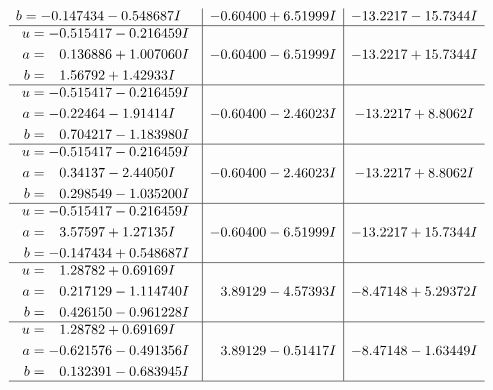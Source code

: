 \documentclass[1p]{elsarticle_modified}
\theoremstyle{definition}
\begin{document}
$$\begin{array}{c|c|c}
\begin{aligned}
b &= -0.147434 - 0.548687 I\end{aligned}
 & -0.60400 + 6.51999 I & -13.2217 - 15.7344 I \\ \hline\begin{aligned}
u &= -0.515417 - 0.216459 I \\
a &= \phantom{-}0.136886 + 1.007060 I \\
b &= \phantom{-}1.56792 + 1.42933 I\end{aligned}
 & -0.60400 - 6.51999 I & -13.2217 + 15.7344 I \\ \hline\begin{aligned}
u &= -0.515417 - 0.216459 I \\
a &= -0.22464 - 1.91414 I \\
b &= \phantom{-}0.704217 - 1.183980 I\end{aligned}
 & -0.60400 - 2.46023 I & -13.2217 + 8.8062 I \\ \hline\begin{aligned}
u &= -0.515417 - 0.216459 I \\
a &= \phantom{-}0.34137 - 2.44050 I \\
b &= \phantom{-}0.298549 - 1.035200 I\end{aligned}
 & -0.60400 - 2.46023 I & -13.2217 + 8.8062 I \\ \hline\begin{aligned}
u &= -0.515417 - 0.216459 I \\
a &= \phantom{-}3.57597 + 1.27135 I \\
b &= -0.147434 + 0.548687 I\end{aligned}
 & -0.60400 - 6.51999 I & -13.2217 + 15.7344 I \\ \hline\begin{aligned}
u &= \phantom{-}1.28782 + 0.69169 I \\
a &= \phantom{-}0.217129 - 1.114740 I \\
b &= \phantom{-}0.426150 - 0.961228 I\end{aligned}
 & \phantom{-}3.89129 - 4.57393 I & -8.47148 + 5.29372 I \\ \hline\begin{aligned}
u &= \phantom{-}1.28782 + 0.69169 I \\
a &= -0.621576 - 0.491356 I \\
b &= \phantom{-}0.132391 - 0.683945 I\end{aligned}
 & \phantom{-}3.89129 - 0.51417 I & -8.47148 - 1.63449 I\\
 \hline 
 \end{array}$$\newpage$$\begin{array}{c|c|c}  

\end{array}$$
\end{document}
